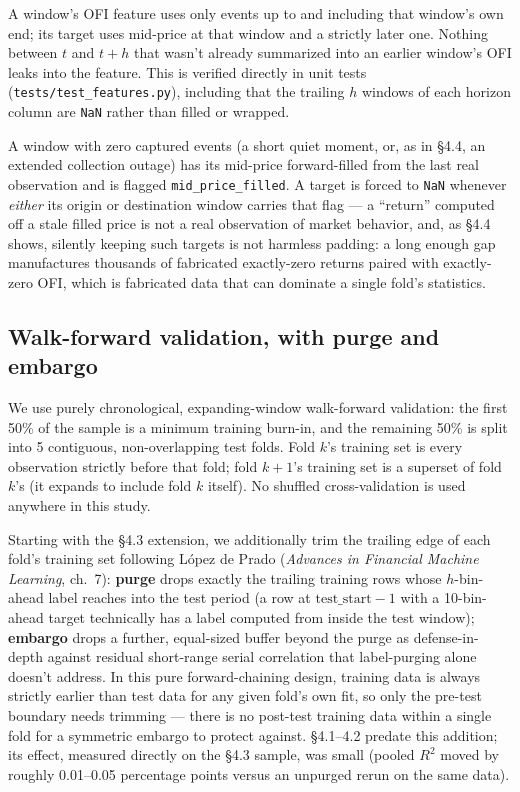 \documentclass[11pt]{article}
\begin{document}
A window's OFI feature uses only events up to and including that window's own end; its target uses mid-price at that window and a strictly later one. Nothing between $t$ and $t+h$ that wasn't already summarized into an earlier window's OFI leaks into the feature. This is verified directly in unit tests (\texttt{tests/test\_features.py}), including that the trailing $h$ windows of each horizon column are \texttt{NaN} rather than filled or wrapped.

A window with zero captured events (a short quiet moment, or, as in \S4.4, an extended collection outage) has its mid-price forward-filled from the last real observation and is flagged \texttt{mid\_price\_filled}. A target is forced to \texttt{NaN} whenever \emph{either} its origin or destination window carries that flag --- a ``return'' computed off a stale filled price is not a real observation of market behavior, and, as \S4.4 shows, silently keeping such targets is not harmless padding: a long enough gap manufactures thousands of fabricated exactly-zero returns paired with exactly-zero OFI, which is fabricated data that can dominate a single fold's statistics.

\subsection{Walk-forward validation, with purge and embargo}

We use purely chronological, expanding-window walk-forward validation: the first 50\% of the sample is a minimum training burn-in, and the remaining 50\% is split into 5 contiguous, non-overlapping test folds. Fold $k$'s training set is every observation strictly before that fold; fold $k+1$'s training set is a superset of fold $k$'s (it expands to include fold $k$ itself). No shuffled cross-validation is used anywhere in this study.

Starting with the \S4.3 extension, we additionally trim the trailing edge of each fold's training set following L\'opez de Prado (\emph{Advances in Financial Machine Learning}, ch.\ 7): \textbf{purge} drops exactly the trailing training rows whose $h$-bin-ahead label reaches into the test period (a row at $\text{test\_start}-1$ with a 10-bin-ahead target technically has a label computed from inside the test window); \textbf{embargo} drops a further, equal-sized buffer beyond the purge as defense-in-depth against residual short-range serial correlation that label-purging alone doesn't address. In this pure forward-chaining design, training data is always strictly earlier than test data for any given fold's own fit, so only the pre-test boundary needs trimming --- there is no post-test training data within a single fold for a symmetric embargo to protect against. \S4.1--4.2 predate this addition; its effect, measured directly on the \S4.3 sample, was small (pooled $R^2$ moved by roughly 0.01--0.05 percentage points versus an unpurged rerun on the same data).
\end{document}
